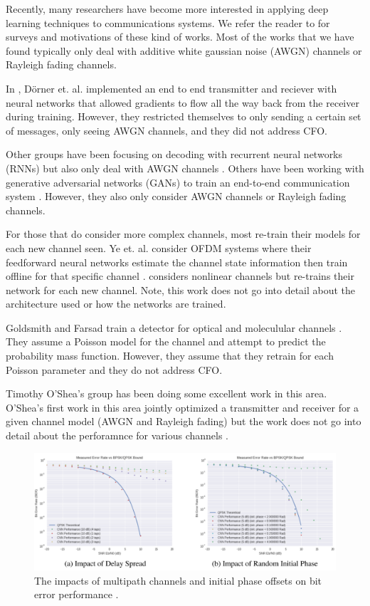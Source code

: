 Recently, many researchers have become more interested in applying deep learning techniques to communications systems.  
We refer the reader to \cite{botoca}\cite{diamandis}\cite{wang}\cite{hemodel}\cite{osheaphys} for surveys and motivations of these kind of works.  
Most of the works that we have found typically only deal with additive white gaussian noise (AWGN) channels or Rayleigh fading channels.

In \cite{dorner2017}, D\"{o}rner et. al. implemented an end to end transmitter and reciever with neural networks that allowed gradients to flow all the way back from the receiver during training.  
However, they restricted themselves to only sending a certain set of messages, only seeing AWGN channels, and they did not address CFO. 

Other groups have been focusing on decoding with recurrent neural networks (RNNs) but also only deal with AWGN channels \cite{kim2018}\cite{kimnips}.  
Others have been working with generative adversarial networks (GANs) to train an end-to-end communication system \cite{yegans}.  However, they also only consider AWGN channels or Rayleigh fading channels.

For those that do consider more complex channels, most re-train their models for each new channel seen.  Ye et. al. consider OFDM systems where their feedforward neural networks estimate the channel state information then train offline for that specific channel \cite{ye2018}.  
\cite{raghavendra} considers nonlinear channels but re-trains their network for each new channel.  Note, this work does not go into detail about the architecture used or how the networks are trained. 

Goldsmith and Farsad train a detector for optical and moleculular channels \cite{farsad2018}.  They assume a Poisson model for the channel and attempt to predict the probability mass function.  However, they assume that they retrain for each Poisson parameter and they do not address CFO.

Timothy O'Shea's group has been doing some excellent work in this area. 
O'Shea's first work in this area jointly optimized a transmitter and receiver for a given channel model (AWGN and Rayleigh fading) but the work does not go into detail about the perforamnce for various channels \cite{osheaphys}.

\begin{figure}
\begin{center}
\includegraphics[width=16cm]{figures/osheaatt2.png}
\caption{The impacts of multipath channels and initial phase offsets on bit error performance \cite{osheaatt}.}
\label{fig:oshea}
\end{center}
\end{figure}

